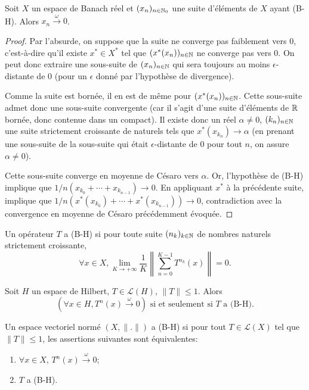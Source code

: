\begin{prop}
  Soit $X$ un espace de Banach réel et $(x_n)_{n\in\mathbb{N}_0}$ une suite
  d'éléments de $X$ ayant (B-H). Alors $x_n\xrightarrow{\omega}0$.
\end{prop}
\begin{proof}
  Par l'absurde, on suppose que la suite ne converge pas faiblement
  vers $0$, c'est-à-dire qu'il existe $x^*\in X^*$ tel que
  $(x^*(x_n))_{n\in\mathbb{N}}$ ne converge pas vers $0$. On peut donc
  extraire une sous-suite de $(x_n)_{n\in\mathbb{N}}$ qui sera toujours au moins
  $\epsilon$-distante de $0$ (pour un $\epsilon$ donné par l'hypothèse de
  divergence).

  Comme la suite est bornée, il en est de même
  pour $(x^*(x_n))_{n\in\mathbb{N}}$. Cette sous-suite admet donc une
  sous-suite convergente (car il s'agit d'une suite d'éléments de $\mathbb{R}$
  bornée, donc contenue dans un compact). Il existe donc un réel $\alpha\neq 0$,
  $(k_n)_{n\in\mathbb{N}}$ une suite strictement croissante de naturels tels que
  $x^*(x_{k_n})\to\alpha$ (en prenant une sous-suite de la sous-suite
  qui était $\epsilon$-distante de 0 pour tout $n$, on assure $\alpha\neq 0$).

  Cette sous-suite converge en moyenne de Césaro vers $\alpha$. Or, l'hypothèse
  de (B-H) implique que $1/n(x_{k_0} + \cdots + x_{k_{n-1}})\to 0$.
  En appliquant $x^*$ à la précédente suite, implique que
  $1/n(x^*(x_{k_0}) + \cdots + x^*(x_{k_{n-1}}))\to 0$, contradiction avec
  la convergence en moyenne de Césaro précédemment évoquée.
\end{proof}

\begin{df}
  Un opérateur $T$ a (B-H) si pour toute suite $(n_k)_{k\in\mathbb{N}}$ de nombres
  naturels strictement croissante,
  $$\forall x\in X,
  \lim_{K\to+\infty}\frac{1}{K}\left\|\sum_{n=0}^{K-1}T^{n_k}(x)\right\| = 0.$$
\end{df}

\begin{thm} Soit $H$ un espace de Hilbert,
  $T\in\mathcal{L}(H)$, $\|T\|\leq 1$. Alors
  $$(\forall x\in H, T^n(x)\xrightarrow{\omega}0) \mbox{ si et seulement si }
  T \mbox{ a (B-H)}.$$
\end{thm}

\begin{df}
  Un espace vectoriel normé $(X, \|.\|)$ a (B-H) si pour tout
  $T\in\mathcal L(X)$ tel que $\|T\|\leq 1$, les assertions suivantes
  sont équivalentes:
  \begin{enumerate}
  \item $\forall x\in X$, $T^n(x)\xrightarrow{\omega} 0$;
  \item $T$ a (B-H).
  \end{enumerate}
\end{df}

